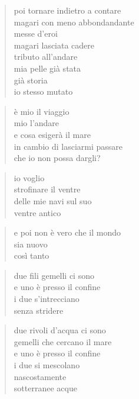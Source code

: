 	\begin{verse}
		poi tornare indietro a contare\\
		magari con meno abbondandante\\
		messe d’eroi\\
		magari lasciata cadere\\
		tributo all’andare\\
		mia pelle già stata\\
		già storia\\
		io stesso mutato
	\end{verse}

	\begin{verse}
		è mio il viaggio\\
		mio l’andare\\
		e cosa esigerà il mare\\
		in cambio di lasciarmi passare\\
		che io non possa dargli?
	\end{verse}

	\begin{verse}
		io voglio\\
		strofinare il ventre\\
		delle mie navi sul suo\\
		ventre antico
	\end{verse}

	\begin{verse}
		e poi non è vero che il mondo\\
		sia nuovo\\
		così tanto
	\end{verse}




	\begin{verse}
		due fili gemelli ci sono\\
		e uno è presso il confine\\
		i due s’intrecciano\\
		senza stridere
	\end{verse}

	\begin{verse}
		due rivoli d’acqua ci sono\\
		gemelli che cercano il mare\\
		e uno è presso il confine\\
		i due si mescolano\\
		nascostamente\\
		sotterranee acque
	\end{verse}

